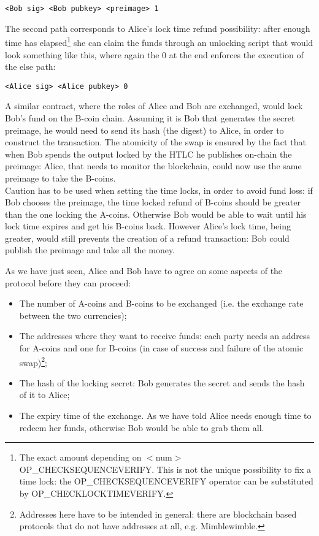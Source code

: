\bigskip

\begin{lstlisting}[frame=single]
<Bob sig> <Bob pubkey> <preimage> 1
\end{lstlisting}

\bigskip
\noindent
The second path corresponds to Alice's lock time refund possibility: after enough time has elapsed\footnote{The exact amount depending on $<$num$>$ OP\_CHECKSEQUENCEVERIFY. This is not the unique possibility to fix a time lock: the OP\_CHECKSEQUENCEVERIFY operator can be substituted by OP\_CHECKLOCKTIMEVERIFY.} she can claim the funds through an unlocking script that would look something like this, where again the 0 at the end enforces the execution of the else path:

\bigskip

\begin{lstlisting}[frame=single]
<Alice sig> <Alice pubkey> 0
\end{lstlisting}

\bigskip
\noindent
A similar contract, where the roles of Alice and Bob are exchanged, would lock Bob's fund on the B-coin chain. Assuming it is Bob that generates the secret preimage, he would need to send its hash (the digest) to Alice, in order to construct the transaction. The atomicity of the swap is ensured by the fact that when Bob spends the output locked by the HTLC he publishes on-chain the preimage: Alice, that needs to monitor the blockchain, could now use the same preimage to take the B-coins.
\\
Caution has to be used when setting the time locks, in order to avoid fund loss: if Bob chooses the preimage, the time locked refund of B-coins should be greater than the one locking the A-coins. Otherwise Bob would be able to wait until his lock time expires and get his B-coins back. However Alice's lock time, being greater, would still prevents the creation of a refund transaction: Bob could publish the preimage and take all the money.

\bigskip
\noindent
As we have just seen, Alice and Bob have to agree on some aspects of the protocol before they can proceed:
\begin{itemize}
	\item The number of A-coins and B-coins to be exchanged (i.e. the exchange rate between the two currencies);
	\item The addresses where they want to receive funds: each party needs an address for A-coins and one for B-coins (in case of success and failure of the atomic swap)\footnote{Addresses here have to be intended in general: there are blockchain based protocols that do not have addresses at all, e.g. Mimblewimble.};
	\item The hash of the locking secret: Bob generates the secret and sends the hash of it to Alice;
	\item The expiry time of the exchange. As we have told Alice needs enough time to redeem her funds, otherwise Bob would be able to grab them all.
\end{itemize}

